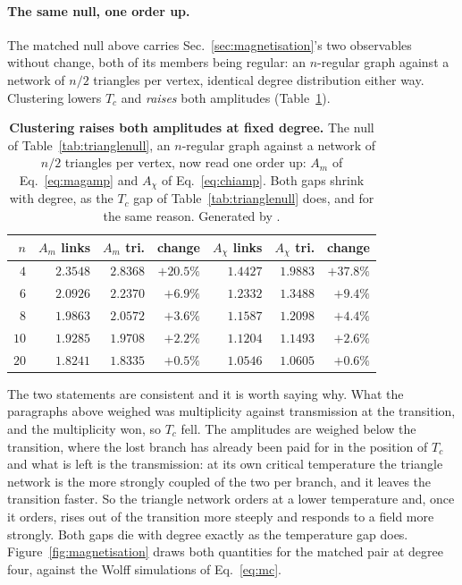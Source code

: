 \paragraph{The same null, one order up.} The matched null above carries
Sec.~\ref{sec:magnetisation}'s two observables without change, both of its
members being regular: an $n$-regular graph against a network of $n/2$
triangles per vertex, identical degree distribution either way. Clustering
lowers $T_{c}$ and \emph{raises} both amplitudes
(Table~\ref{tab:amplitudenull}).
\begin{table}[t]
\centering\small
\begin{tabular}{rrrrrrr}
\hline\hline
$n$ & $A_{m}$ links & $A_{m}$ tri. & change & $A_{\chi}$ links & $A_{\chi}$ tri. & change\\
\hline
$4$ & $2.3548$ & $2.8368$ & $+20.5\%$ & $1.4427$ & $1.9883$ & $+37.8\%$\\
$6$ & $2.0926$ & $2.2370$ & $+6.9\%$ & $1.2332$ & $1.3488$ & $+9.4\%$\\
$8$ & $1.9863$ & $2.0572$ & $+3.6\%$ & $1.1587$ & $1.2098$ & $+4.4\%$\\
$10$ & $1.9285$ & $1.9708$ & $+2.2\%$ & $1.1204$ & $1.1493$ & $+2.6\%$\\
$20$ & $1.8241$ & $1.8335$ & $+0.5\%$ & $1.0546$ & $1.0605$ & $+0.6\%$\\
\hline\hline
\end{tabular}
\caption{\textbf{Clustering raises both amplitudes at fixed degree.} The null of Table~\ref{tab:trianglenull}, an $n$-regular graph against a network of $n/2$ triangles per vertex, now read one order up: $A_{m}$ of Eq.~\eqref{eq:magamp} and $A_{\chi}$ of Eq.~\eqref{eq:chiamp}. Both gaps shrink with degree, as the $T_{c}$ gap of Table~\ref{tab:trianglenull} does, and for the same reason. Generated by .}
\label{tab:amplitudenull}
\end{table}
The two statements are consistent and it is worth saying why. What the
paragraphs above weighed was multiplicity against transmission at the
transition, and the multiplicity won, so $T_{c}$ fell. The amplitudes are
weighed below the transition, where the lost branch has already been paid for
in the position of $T_{c}$ and what is left is the transmission: at its own
critical temperature the triangle network is the more strongly coupled of the
two per branch, and it leaves the transition faster. So the triangle network
orders at a lower temperature and, once it orders, rises out of the transition
more steeply and responds to a field more strongly. Both gaps die with degree
exactly as the temperature gap does. Figure~\ref{fig:magnetisation} draws both
quantities for the matched pair at degree four, against the Wolff simulations
of Eq.~\eqref{eq:mc}.

